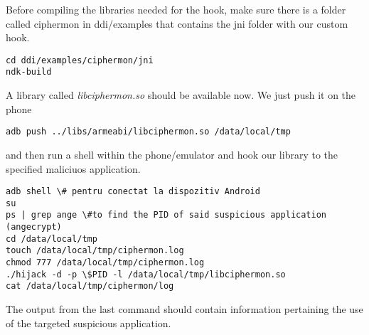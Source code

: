 Before compiling the libraries needed for the hook, make sure there is 
a folder called ciphermon in ddi/examples that contains the jni folder 
with our custom hook.

\begin{verbatim}
cd ddi/examples/ciphermon/jni
ndk-build
\end{verbatim}

A library called \emph{libciphermon.so} should be available now. We 
just push it on the phone
\begin{verbatim}
adb push ../libs/armeabi/libciphermon.so /data/local/tmp
\end{verbatim}
and then run a shell within the phone/emulator and hook our library 
to the specified maliciuos application.
\begin{verbatim}
adb shell \# pentru conectat la dispozitiv Android
su
ps | grep ange \#to find the PID of said suspicious application (angecrypt)
cd /data/local/tmp
touch /data/local/tmp/ciphermon.log
chmod 777 /data/local/tmp/ciphermon.log
./hijack -d -p \$PID -l /data/local/tmp/libciphermon.so
cat /data/local/tmp/ciphermon/log
\end{verbatim}

The output from the last command should contain information 
pertaining the use of the targeted suspicious application.



